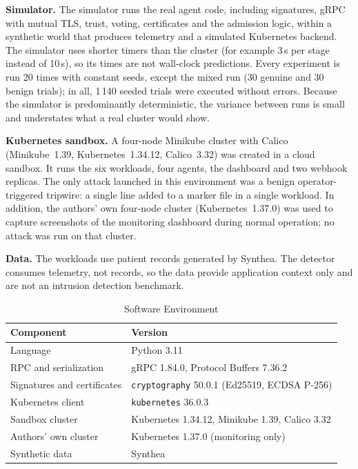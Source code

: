 \documentclass[journal]{IEEEtran}
\begin{document}
\textbf{Simulator.} The simulator runs the real agent code, including signatures, gRPC with mutual TLS, trust, voting, certificates and the admission logic, within a synthetic world that produces telemetry and a simulated Kubernetes backend. The simulator uses shorter timers than the cluster (for example 3\,s per stage instead of 10\,s), so its times are not wall-clock predictions. Every experiment is run 20 times with constant seeds, except the mixed run (30 genuine and 30 benign trials); in all, 1\,140 seeded trials were executed without errors. Because the simulator is predominantly deterministic, the variance between runs is small and understates what a real cluster would show.

\textbf{Kubernetes sandbox.} A four-node Minikube cluster with Calico (Minikube~1.39, Kubernetes~1.34.12, Calico~3.32) was created in a cloud sandbox. It runs the six workloads, four agents, the dashboard and two webhook replicas. The only attack launched in this environment was a benign operator-triggered tripwire: a single line added to a marker file in a single workload. In addition, the authors' own four-node cluster (Kubernetes~1.37.0) was used to capture screenshots of the monitoring dashboard during normal operation; no attack was run on that cluster.

\textbf{Data.} The workloads use patient records generated by Synthea. The detector consumes telemetry, not records, so the data provide application context only and are not an intrusion detection benchmark.

\begin{table}[!t]
\caption{Software Environment}
\label{tab:software}
\centering\small
\begin{tabularx}{\columnwidth}{@{}p{} Y@{}}
\toprule
Component & Version \\
\midrule
Language & Python 3.11 \\
RPC and serialization & gRPC 1.84.0, Protocol Buffers 7.36.2 \\
Signatures and certificates & \texttt{cryptography} 50.0.1 (Ed25519, ECDSA P-256) \\
Kubernetes client & \texttt{kubernetes} 36.0.3 \\
Sandbox cluster & Kubernetes 1.34.12, Minikube 1.39, Calico 3.32 \\
Authors' own cluster & Kubernetes 1.37.0 (monitoring only) \\
Synthetic data & Synthea \\
\bottomrule
\end{tabularx}
\end{table}
\end{document}
